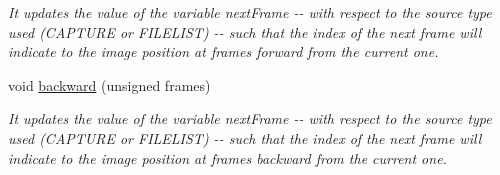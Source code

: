 \begin{DoxyCompactItemize}
\begin{DoxyCompactList}\small\item\em It updates the value of the variable {\ttfamily nextFrame} -\/-\/ with respect to the source type used (CAPTURE or FILELIST) -\/-\/ such that the index of the next frame will indicate to the image position at {\ttfamily frames} forward from the current one. \item\end{DoxyCompactList}\item 
\hypertarget{classImgProducer_a615974ed466627d8b2ab498f7e8b0c7f}{
void \hyperlink{classImgProducer_a615974ed466627d8b2ab498f7e8b0c7f}{backward} (unsigned frames)}
\label{classImgProducer_a615974ed466627d8b2ab498f7e8b0c7f}

\begin{DoxyCompactList}\small\item\em It updates the value of the variable {\ttfamily nextFrame} -\/-\/ with respect to the source type used (CAPTURE or FILELIST) -\/-\/ such that the index of the next frame will indicate to the image position at {\ttfamily frames} backward from the current one. \item\end{DoxyCompactList}\end{DoxyCompactItemize}

